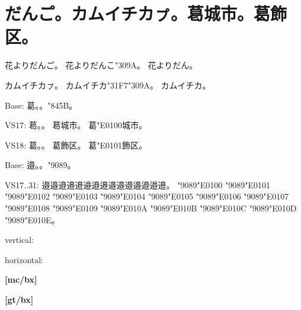 \documentclass[a4paper,titlepage,dvipdfmx]{\class}
\begin{document}
\section{だんこ゚。カムイチカㇷ゚。葛󠄀城市。葛󠄁飾区。}

\ifuptexmode
花よりだんこ゚。
花よりだんこ\kchar"309A。
花よりだん。

カムイチカㇷ゚。
カムイチカ\kchar"31F7\kchar"309A。
カムイチカ。



Base:
葛。。\kchar"845B。

VS17:
葛󠄀。。
葛󠄀城市。
葛\kchar"E0100城市。

VS18:
葛󠄁。。
葛󠄁飾区。
葛\kchar"E0101飾区。


Base:
邉。。\kchar"9089。

VS17..31:
邉󠄀邉󠄁邉󠄂邉󠄃邉󠄄邉󠄅邉󠄆邉󠄇邉󠄈邉󠄉邉󠄊邉󠄋邉󠄌邉󠄍邉󠄎。
\kchar"9089\kchar"E0100
\kchar"9089\kchar"E0101
\kchar"9089\kchar"E0102
\kchar"9089\kchar"E0103
\kchar"9089\kchar"E0104
\kchar"9089\kchar"E0105
\kchar"9089\kchar"E0106
\kchar"9089\kchar"E0107
\kchar"9089\kchar"E0108
\kchar"9089\kchar"E0109
\kchar"9089\kchar"E010A
\kchar"9089\kchar"E010B
\kchar"9089\kchar"E010C
\kchar"9089\kchar"E010D
\kchar"9089\kchar"E010E。

\fi

\vspace{\baselineskip}
vertical:

\vspace{\baselineskip}
horizontal:

\clearpage
[mc/m]




{\bfseries%
[mc/bx]




}

{\gtfamily
[gt/m]




{\bfseries%
[gt/bx]




}}

{\mgfamily
[mg/m]




}
\end{document}
